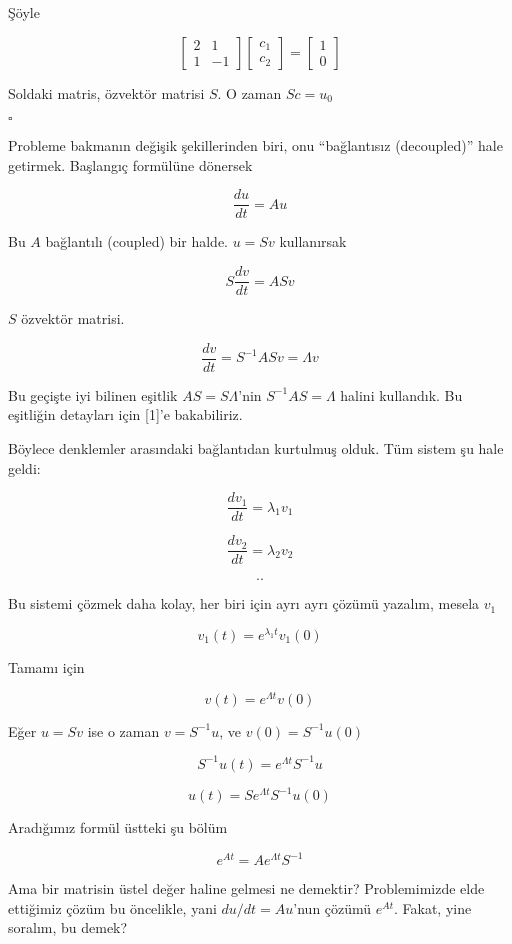 \documentclass[12pt,fleqn]{article}\usepackage{../../common}
\begin{document}
Şöyle

$$ 
\left[\begin{array}{cc}
2 & 1 \\ 1 & -1
\end{array}\right]
\left[\begin{array}{c}
c_1 \\ c_2
\end{array}\right] 
=
\left[\begin{array}{c}
1 \\ 0
\end{array}\right] 
 $$

Soldaki matris, özvektör matrisi $S$. O zaman $Sc = u_0$ 

$\square$

Probleme bakmanın değişik şekillerinden biri, onu ``bağlantısız
(decoupled)'' hale getirmek. Başlangıç formülüne dönersek

$$ \frac{du}{dt} = Au $$

Bu $A$ bağlantılı (coupled) bir halde. $u = Sv$ kullanırsak

$$ S\frac{dv}{dt} = ASv$$

$S$ özvektör matrisi. 

$$ \frac{dv}{dt} = S^{-1}ASv = \Lambda v$$

Bu geçişte iyi bilinen eşitlik $AS=S\Lambda$'nin $S^{-1}AS = \Lambda$
halini kullandık. Bu eşitliğin detayları için [1]'e bakabiliriz.

Böylece denklemler arasındaki bağlantıdan kurtulmuş olduk. Tüm sistem şu
hale geldi:

$$ \frac{dv_1}{dt} = \lambda_1 v_1$$

$$ \frac{dv_2}{dt} = \lambda_2 v_2$$

$$ .. $$

Bu sistemi çözmek daha kolay, her biri için ayrı ayrı çözümü yazalım,
mesela $v_1$

$$ v_1(t) = e^{\lambda_1 t} v_1(0) $$

Tamamı için

$$ v(t) = e^{\Lambda t} v(0) $$

Eğer $u=Sv$ ise o zaman $v=S^{-1}u$, ve $v(0)=S^{-1}u(0)$

$$ S^{-1}u(t) = e^{\Lambda t} S^{-1}u $$

$$ u(t) = Se^{\Lambda t}S^{-1} u(0) $$

Aradığımız formül üstteki şu bölüm

$$ e^{At} = Ae^{\Lambda t} S^{-1} $$

Ama bir matrisin üstel değer haline gelmesi ne demektir? Problemimizde elde
ettiğimiz çözüm bu öncelikle, yani $du/dt = Au$'nun çözümü $e^{At}$. Fakat,
yine soralım, bu demek? 
\end{document}
